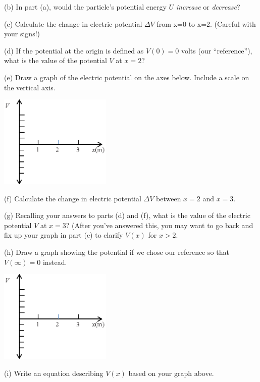 (b) In part (a), would the particle's potential energy $U$ \textit{increase} or \textit{decrease}?
\vspace{0.7in}

(c) Calculate the change in electric potential $\Delta V$ from x=0 to x=2. (Careful with your signs!)
\vspace{0.9in}

(d) If the potential at the origin is defined as $V(0)=0$ volts (our ``reference''), what is the value of the potential $V$ at $x=2$?
\vspace{0.7in}

\pagebreak
(e) Draw a graph of the electric potential on the axes below.  Include a scale on the vertical axis.
\begin{center}
\includegraphics[width=0.4\textwidth]{finding_v_from_e/fig2.eps}
\end{center}

(f) Calculate the change in electric potential $\Delta V$ between $x=2$ and $x=3$.
\vspace{0.5in}

(g) Recalling your answers to parts (d) and (f), what is the value of the electric potential $V$ at $x=3$?  (After you've answered this, you may want to go back and fix up your graph in part (e) to clarify $V(x)$ for $x>2$.
\vspace{0.7in}

(h) Draw a graph showing the potential if we chose our reference so that $V(\infty)=0$ instead.  
\begin{center}
\includegraphics[width=0.4\textwidth]{finding_v_from_e/fig2.eps}
\end{center}
(i) Write an equation describing $V(x)$ based on your graph above.
\vspace{0.9in}

